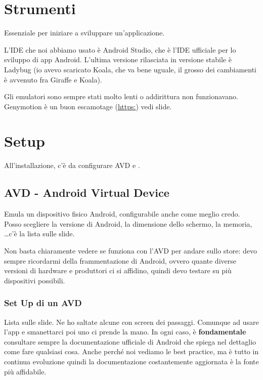 \section{Strumenti}
\par Essenziale per iniziare a sviluppare un'applicazione.
\par L'IDE che noi abbiamo usato è Android Studio, che è l'IDE ufficiale per lo sviluppo di app Android. L'ultima versione rilasciata in versione stabile è Ladybug (io avevo scaricato Koala, che va bene uguale, il grosso dei cambiamenti è avvenuto fra Giraffe e Koala).
\par Gli emulatori sono sempre stati molto lenti o addirittura non funzionavano. Genymotion è un buon escamotage (\url{https:}) vedi slide.

\section{Setup}
\par All'installazione, c'è da configurare AVD e .

\subsection{AVD - Android Virtual Device}
\par Emula un dispositivo fisico Android, configurabile anche come meglio credo. Posso scegliere la versione di Android, la dimensione dello schermo, la memoria, \dots c'è la lista sulle slide.
\par Non basta chiaramente vedere se funziona con l'AVD per andare sullo store: devo sempre ricordarmi della frammentazione di Android, ovvero quante diverse versioni di hardware e produttori ci si affidino, quindi devo testare su più dispositivi possibili.

\subsubsection{Set Up di un AVD}
\par Lista sulle slide. Ne ho saltate alcune con screen dei passaggi. Comunque ad usare l'app e smanettarci poi uno ci prende la mano. In ogni caso, è \textbf{fondamentale} consultare sempre la documentazione ufficiale di Android che spiega nel dettaglio come fare qualsiasi cosa. Anche perché noi vediamo le best practice, ma è tutto in continua evoluzione quindi la documentazione costantemente aggiornata è la fonte più affidabile.


